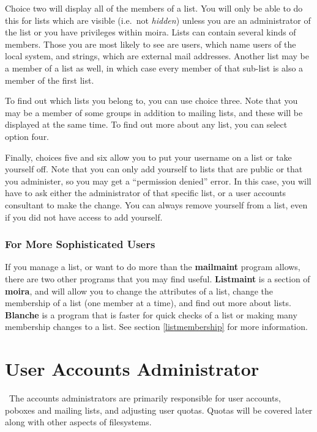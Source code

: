 Choice two will display all of the members of a list.  You will only
be able to do this for lists which are visible (i.e.\ not {\em hidden})
unless you are an administrator of the list or you have privileges
within moira.  Lists can contain several kinds of members.  Those you
are most likely to see are users, which name users of the local
system, and strings, which are external mail addresses.  Another list
may be a member of a list as well, in which case every member of that
sub-list is also a member of the first list.

To find out which lists you belong to, you can use choice three.  Note
that you may be a member of some groups in addition to mailing lists,
and these will be displayed at the same time.  To find out more about
any list, you can select option four.

Finally, choices five and six allow you to put your username on a list
or take yourself off.  Note that you can only add yourself to lists
that are public or that you administer, so you may get a ``permission
denied'' error.  In this case, you will have to ask either the
administrator of that specific list, or a user accounts consultant to
make the change.  You can always remove yourself from a list, even if
you did not have access to add yourself.

\subsection{For More Sophisticated Users}

If you manage a list, or want to do more than the {\bf mailmaint}
program allows, there are two other programs that you may find useful.
 {\bf Listmaint} is a section of {\bf moira}, and will
allow you to change the attributes of a list, change the membership of
a list (one member at a time), and find out more about lists.
 {\bf Blanche} is a program that is faster for quick
checks of a list or making many membership changes to a list.  See
section \ref{listmembership} for more information.

\chapter{User Accounts Administrator}

\athena\ The accounts administrators are primarily responsible for
user accounts, poboxes and mailing lists, and adjusting user quotas.
Quotas will be covered later along with other aspects of filesystems.

